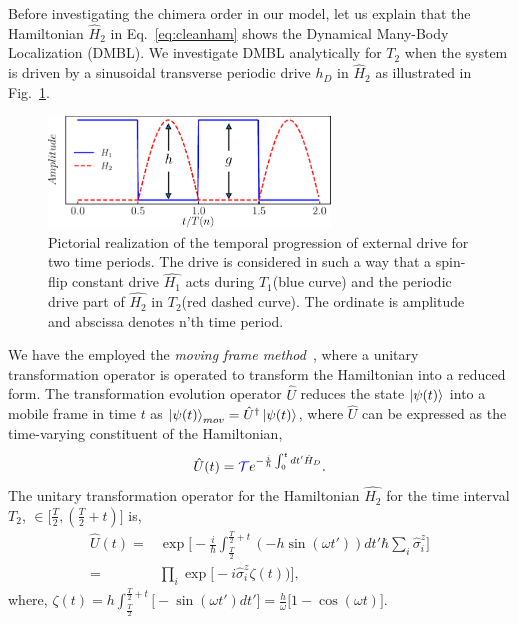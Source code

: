\documentclass[%
nofootinbib,
reprint,
superscriptaddress,
amsmath,amssymb,showkeys,
aps,
prb,
]{revtex4-2}
\newcommand{\blue}[1]{\textcolor{blue}{#1}}
\begin{document}
	Before investigating the chimera order in our model, let us explain that the Hamiltonian $\hat{H}_2$ in Eq.~\eqref{eq:cleanham} shows the Dynamical Many-Body Localization (DMBL). We investigate DMBL analytically for $T_2$  when the system is driven by a sinusoidal transverse periodic drive $h_D$ in $\hat{H}_2$ as illustrated in Fig.~\ref{Fig:time_distribution}.
	\begin{figure}
		\begin{center}
			\includegraphics[width=7.5cm]{drive_distribution.pdf}
		\end{center}
		\caption[]{Pictorial realization of the temporal progression of external drive for two time periods. The drive is considered in such a way that a spin-flip constant drive $\hat{H_1}$ acts during $T_1$(blue curve) and the periodic drive part of $\hat{H_2}$ in $T_2$(red dashed curve). The ordinate is amplitude and abscissa denotes n'th time period.}
		\label{Fig:time_distribution}
	\end{figure}	
	We have the employed the \textit{moving frame method}~\cite{haldar_dynamical_2021}, where a unitary transformation operator is operated to transform the Hamiltonian into a reduced form. The transformation evolution operator $\hat{U}$ reduces the state $\ket{\psi(t)}$ into a mobile frame in time $t$ as $\ket{\psi(t)}_{mov} = \hat{U}^\dagger \ket{\psi(t)}$, where $\hat{U}$ can be expressed as the time-varying constituent of the Hamiltonian,
	\begin{equation}
		\hat{U}(t) = \blue{\mathcal{T}} e^{-\frac{i}{\hbar}\int_{0}^{t} dt' \hat{H}_D}.
		\label{eq:rot1}
	\end{equation}
	The unitary transformation operator for the Hamiltonian $\hat{H_2}$ for the time interval $T_2$, $\in{\Big[\frac{T}{2}, (\frac{T}{2}+t) \Big]}$ is,
	\begin{align}
		\hat{U}(t) =& \exp \Bigg[-\frac{i}{\hbar}\int_{\frac{T}{2}}^{\frac{T}{2}+t} (-h \sin(\omega t'))dt'\hbar\sum_i\hat{\sigma}^z_i\Bigg]\nonumber\\
		=& \prod_{i} \exp\Big[-i \hat{\sigma}^z_i\zeta(t))\Big],
	\end{align}	
	where, $\displaystyle{
		\zeta (t) = h\int_{\frac{T}{2}}^{\frac{T}{2}+t}  \Big[-\sin(\omega t')dt'\Big]=  \frac{h}{\omega}\Big[1-\cos(\omega t)\Big]}$.		
\end{document}
